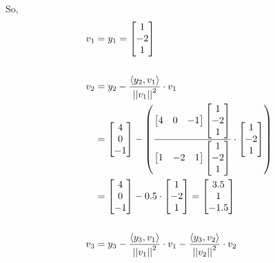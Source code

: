 \documentclass[a4paper]{article}
\begin{document}
\begin{qalist}
			So, \begin{align}
				{v}_{1} &= {y}_{1} = \begin{bmatrix}1 \\ -2 \\ 1\end{bmatrix} \\ \notag \\
				{v}_{2} &= {y}_{2} - \frac{\langle {y}_{2}, {v}_{1}\rangle}{{||{v}_{1}||}^{2}}  \cdot {v}_{1} \\
				\notag &= \begin{bmatrix}4 \\ 0 \\ -1\end{bmatrix} - \left( \frac{\begin{bmatrix}4 & 0 & -1\end{bmatrix} \begin{bmatrix}1 \\ -2 \\ 1\end{bmatrix}}{\begin{bmatrix}1 & -2 & 1\end{bmatrix}\begin{bmatrix}1 \\ -2 \\ 1\end{bmatrix}} \cdot \begin{bmatrix}1 \\ -2 \\ 1\end{bmatrix}\right) \\
				\notag &= \begin{bmatrix}4 \\ 0 \\ -1\end{bmatrix} - 0.5\cdot \begin{bmatrix}1 \\ -2 \\ 1\end{bmatrix} = \begin{bmatrix}3.5 \\ 1 \\ -1.5\end{bmatrix} \\ \notag \\
				{v}_{3} &= {y}_{3} - \frac{\langle {y}_{3}, {v}_{1}\rangle}{{||{v}_{1}||}^{2}}  \cdot {v}_{1} - \frac{\langle {y}_{3}, {v}_{2}\rangle}{{||{v}_{2}||}^{2}}  \cdot {v}_{2} \\

\end{align}
\end{qalist}
\end{document}
